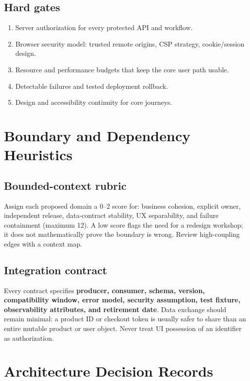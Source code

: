 \documentclass[11pt,letterpaper,oneside]{report}
\begin{document}
\section{Hard gates}
\begin{enumerate}\item Server authorization for every protected API and workflow.
\item Browser security model: trusted remote origins, CSP strategy, cookie/session design.
\item Resource and performance budgets that keep the core user path usable.
\item Detectable failures and tested deployment rollback.
\item Design and accessibility continuity for core journeys.
\end{enumerate}
\chapter{Boundary and Dependency Heuristics}
\section{Bounded-context rubric}
Assign each proposed domain a 0--2 score for: business cohesion, explicit owner, independent release, data-contract stability, UX separability, and failure containment (maximum 12). A low score flags the need for a redesign workshop; it does not mathematically prove the boundary is wrong. Review high-coupling edges with a context map.
\section{Integration contract}
Every contract specifies \textbf{producer, consumer, schema, version, compatibility window, error model, security assumption, test fixture, observability attributes, and retirement date}. Data exchange should remain minimal: a product ID or checkout token is usually safer to share than an entire mutable product or user object. Never treat UI possession of an identifier as authorization.
\chapter{Architecture Decision Records}
\end{document}
